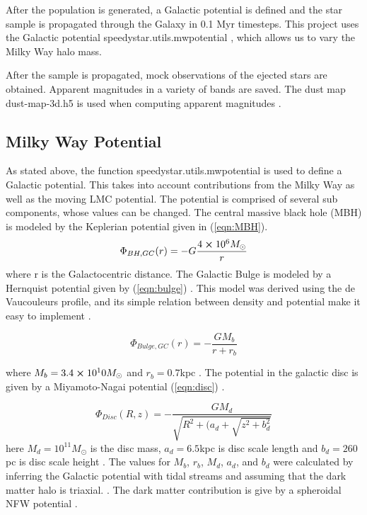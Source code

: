 \documentclass[12pt]{article}
\begin{document}
After the population is generated, a Galactic potential is defined and the star sample is propagated through the Galaxy in 0.1 Myr timesteps. This project uses the Galactic potential {\selectfont speedystar.utils.mwpotential} \cite{Evans_2021}, which allows us to vary the Milky Way halo mass.  

After the sample is propagated, mock observations of the ejected stars are obtained. Apparent magnitudes in a variety of bands are saved. The dust map dust-map-3d.h5 is used when computing apparent magnitudes \cite{bovy_2015_31262}. 

\subsection{Milky Way Potential}\label{sec:MWpot}

As stated above, the function {\selectfont speedystar.utils.mwpotential} is used to define a Galactic potential. This takes into account contributions from the Milky Way as well as the moving LMC potential. The potential is comprised of several sub components, whose values can be changed. The central massive black hole (MBH) is modeled by the Keplerian potential given in (\ref{eqn:MBH}). 
\begin{equation}\label{eqn:MBH}
    \Phi_{BH,GC}(r) = -G\frac{4\cross10^6M_\odot}{r}
\end{equation}
where r is the Galactocentric distance. 
The Galactic Bulge is modeled by a Hernquist potential given by (\ref{eqn:bulge})\cite{Hernquist} . This model was derived using the de Vaucouleurs profile, and its simple relation between density and potential make it easy to implement \cite{Vaucouleurs}.  

\begin{equation}\label{eqn:bulge}
    \Phi_{Bulge,GC}(r) = -\frac{GM_b}{r+r_b}
\end{equation}

where $M_b = 3.4\cross 10^10 M_\odot$ and $r_b = 0.7$kpc \cite{Price-whelan}. The potential in the galactic disc is given by a Miyamoto-Nagai potential (\ref{eqn:disc}) \cite{Miyamoto}.

\begin{equation}\label{eqn:disc}
    \Phi_{Disc}(R,z) = -\frac{GM_d}{\sqrt{R^2+(a_d+\sqrt{z^2+b_d^2}}}
\end{equation}
here $M_d = 10^{11}M_\odot$ is the disc mass, $a_d = 6.5$kpc is disc scale length and $b_d = 260$pc is disc scale height \cite{Price-whelan}. The values for $M_b$, $r_b$, $M_d$, $a_d$, and $b_d$ were calculated by inferring the Galactic potential with tidal streams and assuming that the dark matter halo is triaxial. \cite{Price-whelan}. The dark matter contribution is give by a spheroidal NFW potential \cite{NFW}. 
\end{document}
